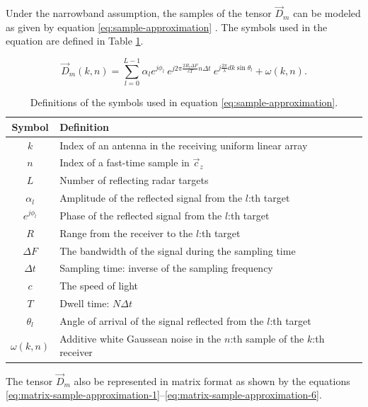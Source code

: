 Under the narrowband assumption, the samples of the tensor $\vec{D}_m$ can be modeled
as given by equation \ref{eq:sample-approximation} \cite{music-based-algo}.
The symbols used in the equation  are defined in Table \ref{tab:sample-approximation-variables}.

\begin{equation}
\label{eq:sample-approximation}
\vec{D}_{m} (k, n) =
    \sum_{l=0}^{L-1} \alpha_{l} e^{j \phi_{l}} ~
        e^{j 2 \pi \frac{2 R_{l} \Delta F}{c T} n \Delta t } ~
        e^{ j \frac{2 \pi}{ \lambda } d k \sin \theta_{l}}
        + \omega(k, n).
\end{equation}

\begin{table}[]
    \centering
    \begin{tabular}{c l l}
    \toprule
        \textbf{Symbol} & \textbf{Definition} \\
    \midrule
        $k$ & Index of an antenna in the receiving uniform linear array \\
        $n$ & Index of a fast-time sample in $\vec{c}_z$\\
        $L$ & Number of reflecting radar targets \\
        $\alpha_{l}$ & Amplitude of the reflected signal from the $l$:th target \\
        $e^{j \phi_{l}}$ & Phase of the reflected signal from the $l$:th target\\
        $R$ & Range from the receiver to the $l$:th target \\
        $\Delta F$ & The bandwidth of the signal during the sampling time \\
        $\Delta t$ & Sampling time: inverse of the sampling frequency \\
        $c$ & The speed of light \\
        $T$ & Dwell time: $N \Delta t$\\
        $\theta_{l}$ & Angle of arrival of the signal reflected from the $l$:th target \\
        $\omega(k, n)$ & Additive white Gaussean noise in the $n$:th sample of the $k$:th receiver \\
    \bottomrule
    \end{tabular}
    \caption{Definitions of the symbols used in equation \ref{eq:sample-approximation}.}
    \label{tab:sample-approximation-variables}
\end{table}

The tensor $\vec{D}_m$ also be represented in matrix format as shown by the equations 
\ref{eq:matrix-sample-approximation-1}--\ref{eq:matrix-sample-approximation-6}.

